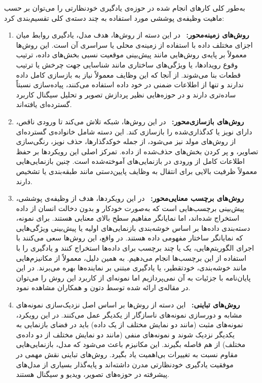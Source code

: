 به‌طور کلی کارهای انجام شده در حوزه‌ی یادگیری خودنظارتی را می‌توان بر حسب ماهیت وظیفه‌ی پوششی مورد استفاده به چند دسته‌ی کلی تقسیم‌بندی کرد:

\begin{enumerate}

\item \textbf{روش‌های زمینه‌محور:} \
در این دسته از روش‌ها، هدف مدل، یادگیری روابط میان اجزای مختلف داده با استفاده از زمینه‌ی محلی یا سراسری آن است. این روش‌ها معمولاً بر پایه‌ی روش‌هایی مانند پیش‌بینی موقعیت نسبی بخش‌های داده، ترتیب وقوع رویدادها، یا ویژگی‌های ساختاری مانند شناسایی جهت چرخش یا ترتیب قطعات بنا می‌شوند. از آنجا که این وظایف معمولاً نیاز به بازسازی کامل داده ندارند و تنها از اطلاعات ضمنی در خود داده استفاده می‌کنند، پیاده‌سازی نسبتاً ساده‌تری دارند و در حوزه‌هایی نظیر پردازش تصویر و تحلیل سیگنال کاربرد گسترده‌ای یافته‌اند.

\item \textbf{روش‌های بازسازی‌محور:} \
در این روش‌ها، شبکه تلاش می‌کند تا ورودی ناقص، دارای نویز یا کدگذاری‌شده را بازسازی کند. این دسته شامل خانواده‌ی گسترده‌ای از روش‌های مولد
نیز می‌شود، از جمله خوکدگذارها، حذف نویز، رنگی‌سازی تصاویر، و پر کردن بخش‌های حذف‌شده از داده. تمرکز اصلی این رویکردها بر حفظ اطلاعات کامل از ورودی در بازنمایی‌های آموخته‌شده است. چنین بازنمایی‌هایی معمولاً ظرفیت بالایی برای انتقال به وظایف پایین‌دستی مانند طبقه‌بندی یا تشخیص دارند.

\item \textbf{روش‌های برچسب معنایی‌محور\LTRfootnote{Semantic Label-based}:} \
در این رویکردها، هدف از وظیفه‌ی پوششی، پیش‌بینی برچسب‌هایی است که به‌صورت خودکار و بدون دخالت انسان از داده استخراج شده‌اند، اما نمایانگر مفاهیم سطح بالای معنایی هستند. برای نمونه، دسته‌بندی داده‌ها بر اساس خوشه‌بندی بازنمایی‌های اولیه یا پیش‌بینی ویژگی‌هایی که نمایانگر ساختار مفهومی داده هستند. در واقع، این روش‌ها سعی می‌کنند با اجرای الگوریتم‌هایی، یک یا چند برچسب برای داده‌ها استخراج کنند و یادگیری را با استفاده از این برچسب‌ها انجام می‌دهیم. به همین دلیل، معمولاً از مکانیزم‌هایی مانند خوشه‌بندی، خودتقطیر،
یا یادگیری مبتنی بر نماینده‌ها بهره می‌برند. در این پایان‌نامه با جزئیات به آن نمی‌پردازیم اما نمونه‌ای از کاربرد این روش را می‌توان در مقاله‌ی ارائه شده توسط دتون و همکاران\cite{detone2018superpoint}
مشاهده نمود.

\item \textbf{روش‌های تباینی:} \
این دسته از روش‌ها بر اساس اصل نزدیک‌سازی نمونه‌های مشابه و دورسازی نمونه‌های ناسازگار از یکدیگر عمل می‌کنند. در این رویکرد، نمونه‌های مثبت (مانند دو نمایش
مختلف از یک داده) باید در فضای بازنمایی به یکدیگر نزدیک شوند و نمونه‌های منفی (مانند دو نمایش مختلف از دو داده‌ی مختلف) از هم فاصله بگیرند. این مکانیزم باعث می‌شود که مدل، بازنمایی‌هایی مقاوم نسبت به تغییرات بی‌اهمیت یاد بگیرد. روش‌های تباینی نقش مهمی در موفقیت یادگیری خودنظارتی مدرن داشته‌اند و پایه‌گذار بسیاری از مدل‌های پیشرفته در حوزه‌های تصویر، ویدیو و سیگنال هستند.

\end{enumerate}


